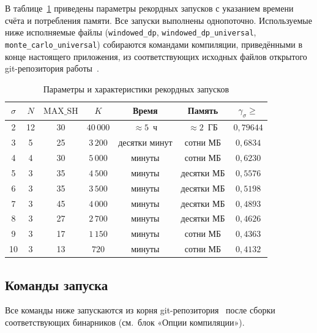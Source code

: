 В таблице~\ref{tab:appb-runs} приведены параметры рекордных запусков с указанием времени счёта и потребления памяти. Все запуски выполнены однопоточно. Используемые ниже исполняемые файлы (\texttt{windowed\_dp}, \texttt{windowed\_dp\_universal}, \texttt{monte\_carlo\_universal}) собираются командами компиляции, приведёнными в конце настоящего приложения, из соответствующих исходных файлов открытого git-репозитория работы~\cite{ourgithub}.

\begin{table}[h!]
\caption{Параметры и характеристики рекордных запусков}
\label{tab:appb-runs}
\centering
\small
\begin{tabular}{|c|c|c|c|c|c|c|}
\hline
$\sigma$ & $N$ & $\mathrm{MAX\_SH}$ & $K$ & Время & Память & $\gamma_\sigma \geq$ \\
\hline
2  & 12 & 30 & $40\,000$ & $\approx 5$~ч  & $\approx 2$~ГБ & $0{,}79644$ \\
3  & 5  & 25 & $3\,200$  & десятки минут & сотни МБ      & $0{,}6834$ \\
4  & 4  & 30 & $5\,000$  & минуты         & сотни МБ      & $0{,}6230$ \\
5  & 3  & 35 & $4\,500$  & минуты         & десятки МБ    & $0{,}5576$ \\
6  & 3  & 35 & $3\,500$  & минуты         & десятки МБ    & $0{,}5198$ \\
7  & 3  & 45 & $4\,000$  & минуты         & десятки МБ    & $0{,}4893$ \\
8  & 3  & 27 & $2\,700$  & минуты         & десятки МБ    & $0{,}4626$ \\
9  & 3  & 17 & $1\,150$  & минуты         & сотни МБ      & $0{,}4363$ \\
10 & 3  & 13 & $720$     & минуты         & сотни МБ      & $0{,}4132$ \\
\hline
\end{tabular}
\end{table}

\subsection*{Команды запуска}

Все команды ниже запускаются из корня git-репозитория~\cite{ourgithub} после сборки соответствующих бинарников (см.\ блок «Опции компиляции»).

